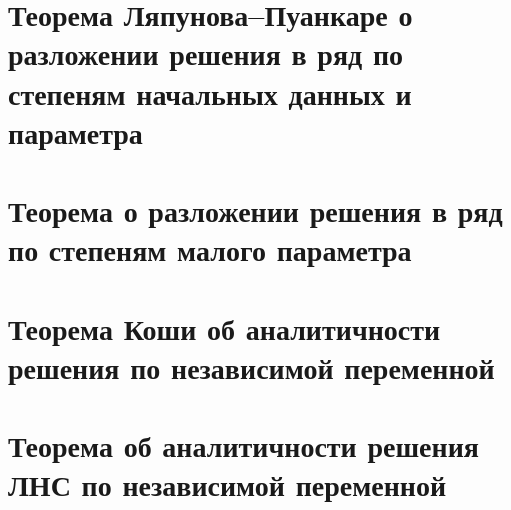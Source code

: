 \section{Теорема Ляпунова--Пуанкаре о разложении решения в ряд по степеням начальных данных и параметра}

\section{Теорема о разложении решения в ряд по степеням малого параметра}

\section{Теорема Коши об аналитичности решения по независимой переменной}

\section{Теорема об аналитичности решения ЛНС по независимой переменной}
